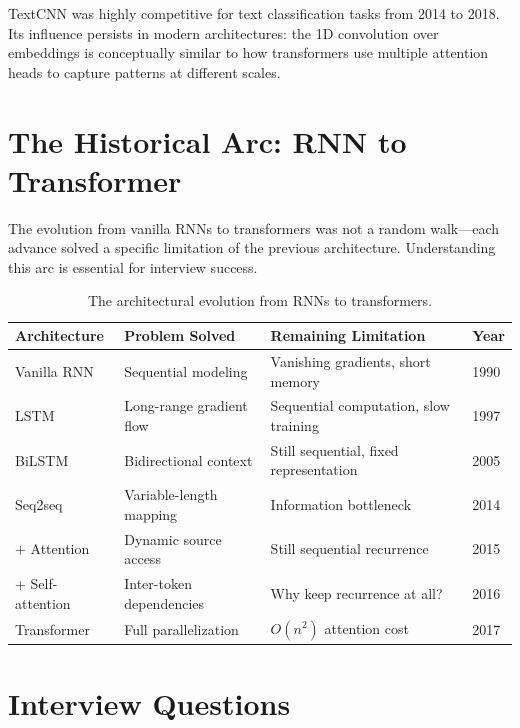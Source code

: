 TextCNN was highly competitive for text classification tasks from 2014 to
2018.  Its influence persists in modern architectures: the 1D convolution
over embeddings is conceptually similar to how transformers use multiple
attention heads to capture patterns at different scales.


\section{The Historical Arc: RNN to Transformer}
\label{sec:historical_arc}

The evolution from vanilla RNNs to transformers was not a random walk---each
advance solved a specific limitation of the previous architecture.
Understanding this arc is essential for interview success.

\begin{table}[H]
\centering
\caption{The architectural evolution from RNNs to transformers.}
\label{tab:evolution}
\begin{tabularx}{\textwidth}{lXXl}
\toprule
\textbf{Architecture} & \textbf{Problem Solved} & \textbf{Remaining Limitation}
& \textbf{Year} \\
\midrule
Vanilla RNN & Sequential modeling & Vanishing gradients, short memory & 1990 \\
LSTM & Long-range gradient flow & Sequential computation, slow training & 1997 \\
BiLSTM & Bidirectional context & Still sequential, fixed representation & 2005 \\
Seq2seq & Variable-length mapping & Information bottleneck & 2014 \\
+ Attention & Dynamic source access & Still sequential recurrence & 2015 \\
+ Self-attention & Inter-token dependencies & Why keep recurrence at all? & 2016 \\
Transformer & Full parallelization & $O(n^2)$ attention cost & 2017 \\
\bottomrule
\end{tabularx}
\end{table}


\section{Interview Questions}
\label{sec:neural_seq_interview}


